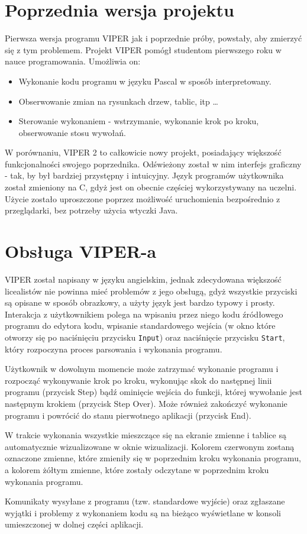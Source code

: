 \documentclass[a4paper,twoside,openright,11pt]{report}
\begin{document}
  \section{Poprzednia wersja projektu}
\par Pierwsza wersja programu VIPER jak i poprzednie próby, powstały, aby zmierzyć się z tym problemem. Projekt VIPER pomógł studentom pierwszego roku w nauce programowania. Umożliwia on:
\begin{itemize}

  \item Wykonanie kodu programu w języku Pascal w sposób interpretowany.
  \item Obserwowanie zmian na rysunkach drzew, tablic, itp \ldots
  \item Sterowanie wykonaniem - wstrzymanie, wykonanie krok po kroku, obserwowanie stosu wywołań.

\end{itemize}
 
\par W porównaniu, VIPER 2 to całkowicie nowy projekt, posiadający większość funkcjonalności swojego poprzednika. Odświeżony został w nim interfejs graficzny - tak, by był bardziej przystępny i intuicyjny. Język programów użytkownika został zmieniony na C, gdyż jest on obecnie częściej wykorzystywany na uczelni. Użycie zostało uproszczone poprzez możliwość uruchomienia bezpośrednio z przeglądarki, bez potrzeby użycia wtyczki Java.

  \section{Obsługa VIPER-a}
\par VIPER został napisany w języku angielskim, jednak zdecydowana większość licealistów nie powinna mieć problemów z jego obsługą, gdyż wszystkie przyciski są opisane w sposób obrazkowy, a użyty język jest bardzo typowy i prosty. Interakcja z użytkownikiem polega na wpisaniu przez niego kodu źródłowego programu do edytora kodu, wpisanie standardowego wejścia (w okno które otworzy się po naciśnięciu przycisku \texttt{Input}) oraz naciśnięcie przycisku \texttt{Start}, który rozpoczyna proces parsowania i wykonania programu. 
\par Użytkownik w dowolnym momencie może zatrzymać wykonanie programu i rozpocząć wykonywanie krok po kroku, wykonując skok do następnej linii programu (przycisk Step) bądź ominięcie wejścia do funkcji, której wywołanie jest następnym krokiem (przycisk Step Over). Może również zakończyć wykonanie programu i powrócić do stanu pierwotnego aplikacji (przycisk End).
\par W trakcie wykonania wszystkie mieszczące się na ekranie zmienne i tablice są automatycznie wizualizowane w oknie wizualizacji. Kolorem czerwonym zostaną oznaczone zmienne, które zmieniły się w poprzednim kroku wykonania programu, a kolorem żółtym zmienne, które zostały odczytane w poprzednim kroku wykonania programu. 
\par Komunikaty wysyłane z programu (tzw. standardowe wyjście) oraz zgłaszane wyjątki i problemy z wykonaniem kodu są na bieżąco wyświetlane w konsoli umieszczonej w dolnej części aplikacji. 
\end{document}
